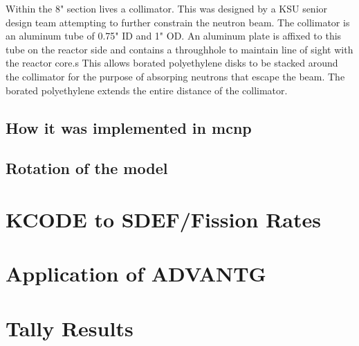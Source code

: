 Within the 8" section lives a collimator.
This was designed by a KSU senior design team attempting to further constrain the neutron beam.
The collimator is an aluminum tube of 0.75" ID and 1" OD.
An aluminum plate is affixed to this tube on the reactor side and contains a throughhole to maintain line of sight with the reactor core.s
This allows borated polyethylene disks to be stacked around the collimator for the purpose of absorping neutrons that escape the beam.
The borated polyethylene extends the entire distance of the collimator. 


\subsection{How it was implemented in mcnp}
\subsection{Rotation of the model}


\section{KCODE to SDEF/Fission Rates}

\section{Application of ADVANTG}

\section{Tally Results}
